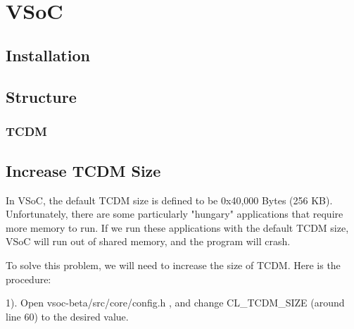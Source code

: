 \documentclass{article}
\title{
\vspace{2in}
\textmd{\textbf{\hmwkClass}}\\
\textmd{\textbf{\hmwkTitle}}\\
\normalsize\vspace{0.1in}\small{\hmwkDueDate}\\
\vspace{0.1in}\large{\textit{\hmwkClassInstructor}}
\vspace{3in}
}
\author{\textbf{\hmwkAuthorName}}
\date{}
\begin{document}
\maketitle


\setcounter{tocdepth}{3} %

\newpage
\tableofcontents
\newpage




\section{VSoC}

\subsection{Installation}
\subsection{Structure}
\subsubsection{TCDM}
\subsection{Increase TCDM Size}
In VSoC, the default TCDM size is defined to be 0x40,000 Bytes (256 KB).  Unfortunately,  there are some particularly "hungary" applications that require more memory to run.  If we run these applications with the default TCDM size, VSoC will run out of shared memory, and the program will crash. 

To solve this problem, we will need to increase the size of TCDM. Here is the procedure:

\vspace{2mm}

1). Open vsoc-beta/src/core/config.h , and change CL\_TCDM\_SIZE (around line 60) to the desired value.
\end{document}
